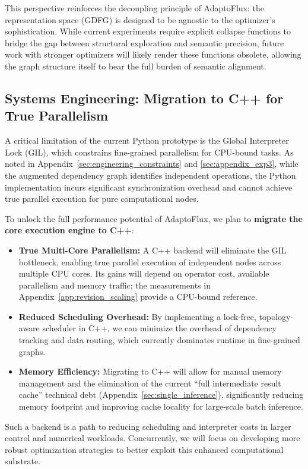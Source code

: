 This perspective reinforces the decoupling principle of AdaptoFlux: the representation space (GDFG) is designed to be agnostic to the optimizer's sophistication. While current experiments require explicit collapse functions to bridge the gap between structural exploration and semantic precision, future work with stronger optimizers will likely render these functions obsolete, allowing the graph structure itself to bear the full burden of semantic alignment.

\subsection{Systems Engineering: Migration to C++ for True Parallelism}
\label{subsec:cpp_migration}

A critical limitation of the current Python prototype is the Global Interpreter Lock (GIL), which constrains fine-grained parallelism for CPU-bound tasks. As noted in Appendix~\ref{sec:engineering_constraints} and \ref{sec:appendix_exp3}, while the augmented dependency graph identifies independent operations, the Python implementation incurs significant synchronization overhead and cannot achieve true parallel execution for pure computational nodes.

To unlock the full performance potential of AdaptoFlux, we plan to \textbf{migrate the core execution engine to C++}:
\begin{itemize}
    \item \textbf{True Multi-Core Parallelism:} A C++ backend will eliminate the GIL bottleneck, enabling true parallel execution of independent nodes across multiple CPU cores. Its gains will depend on operator cost, available parallelism and memory traffic; the measurements in Appendix~\ref{app:revision_scaling} provide a CPU-bound reference.
    \item \textbf{Reduced Scheduling Overhead:} By implementing a lock-free, topology-aware scheduler in C++, we can minimize the overhead of dependency tracking and data routing, which currently dominates runtime in fine-grained graphs.
    \item \textbf{Memory Efficiency:} Migrating to C++ will allow for manual memory management and the elimination of the current ``full intermediate result cache'' technical debt (Appendix~\ref{sec:single_inference}), significantly reducing memory footprint and improving cache locality for large-scale batch inference.
\end{itemize}

Such a backend is a path to reducing scheduling and interpreter costs in larger control and numerical workloads. Concurrently, we will focus on developing more robust optimization strategies to better exploit this enhanced computational substrate.

